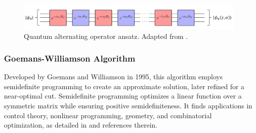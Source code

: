 \begin{figure}[b]
  \centering
  \includegraphics[width = \textwidth]{Figures/QAOA_Trotterization.png}
  \caption{Quantum alternating operator ansatz. Adapted from \cite{Intro_QAOA}.}
  \label{fig:QAOA_Trotterization}
\end{figure}

\subsubsection{Goemans-Williamson Algorithm}
\label{sec: GW}

Developed by Goemans and Williamson in 1995, this algorithm employs semidefinite programming to create an approximate solution, later refined for a near-optimal cut. Semidefinite programming optimizes a linear function over a symmetric matrix while ensuring positive semidefiniteness. It finds applications in control theory, nonlinear programming, geometry, and combinatorial optimization, as detailed in \cite{GW-Algorithm} and references therein.


